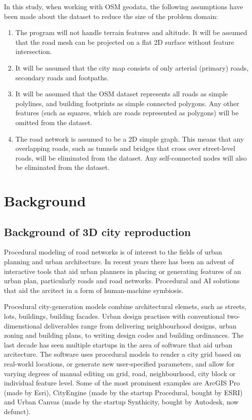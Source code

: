 \documentclass{kththesis}
\begin{document}
In this study, when working with OSM geodata, the following assumptions have been made about the dataset to reduce the size of the problem domain:

\begin{enumerate}
    \item The program will not handle terrain features and altitude. It will be assumed that the road mesh can be projected on a flat 2D surface without feature intersection.
    \item It will be assumed that the city map consists of only arterial (primary) roads, secondary roads and footpaths.
    \item It will be assumed that the OSM dataset represents all roads as simple polylines, and building footprints as simple connected polygons. Any other features (such as squares, which are roads represented as polygons) will be omitted from the dataset.
    \item The road network is assumed to be a 2D simple graph. This means that any overlapping roads, such as tunnels and bridges that cross over street-level roads, will be eliminated from the dataset. Any self-connected nodes will also be eliminated from the dataset.
\end{enumerate}

\chapter{Background}

\section{Background of 3D city reproduction}

Procedural modeling of road networks is of interest to the fields of urban planning and urban architecture. In recent years there has been an advent of interactive tools that aid urban planners in placing or generating features of an urban plan, particularly roads and road networks. Procedural and AI solutions that aid the arcitect in a form of human-machine symbiosis.

Procedural city-generation models combine architectural elemets, such as streets, lots, buildings, building facades.
Urban design practises with conventional two-dimenstional deliverables range from delivering neighbourhood designs, urban zoning and building plans, to writing design codes and building ordinances.
The last decade has seen multiple startups in the area of software that aid urban arcitecture. The software uses procedural models to render a city grid based on real-world locations, or generate new user-specified parameters, and allow for varying degrees of manual editing on grid, road, neighbourhood, city block or individual feature level.
Some of the most prominent examples are ArcGIS Pro (made by Esri), CityEngine (made by the startup Procedural, bought by ESRI) and Urban Canvas (made by the startup Synthicity, bought by Autodesk, now defunct).
\end{document}
